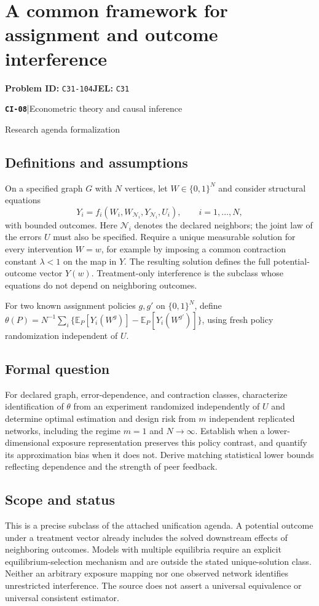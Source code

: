 \documentclass[11pt,a4paper]{article}
\newcommand{\E}{\mathbb E}
\newcommand{\entrymeta}[3]{{\sffamily\small\color{muted}\textbf{\texttt{#1}}\quad|\quad #2\par #3\par}}
\begin{document}
\section*{A common framework for assignment and outcome interference}
\textbf{Problem ID:} \texttt{C31-104}\quad \textbf{JEL:} \texttt{C31}\par
\label{problem:OP-0487}
\label{beyond:CI-08}
\entrymeta{CI-08}{Econometric theory and causal inference}{Research agenda formalization}
\subsection*{Definitions and assumptions}
On a specified graph $G$ with $N$ vertices, let $W\in\{0,1\}^N$ and consider structural equations
\[
Y_i=f_i(W_i,W_{\mathcal N_i},Y_{\mathcal N_i},U_i),
\qquad i=1,\ldots,N,
\]
with bounded outcomes. Here $\mathcal N_i$ denotes the declared neighbors; the joint law of the errors $U$ must also be specified. Require a unique measurable solution for every intervention $W=w$, for example by imposing a common contraction constant $\lambda<1$ on the map in $Y$. The resulting solution defines the full potential-outcome vector $Y(w)$. Treatment-only interference is the subclass whose equations do not depend on neighboring outcomes.

For two known assignment policies $g,g'$ on $\{0,1\}^N$, define $\theta(P)=N^{-1}\sum_i\{\E_P[Y_i(W^g)]-\E_P[Y_i(W^{g'})]\}$, using fresh policy randomization independent of $U$.
\subsection*{Formal question}
For declared graph, error-dependence, and contraction classes, characterize identification of $\theta$ from an experiment randomized independently of $U$ and determine optimal estimation and design risk from $m$ independent replicated networks, including the regime $m=1$ and $N\to\infty$. Establish when a lower-dimensional exposure representation preserves this policy contrast, and quantify its approximation bias when it does not. Derive matching statistical lower bounds reflecting dependence and the strength of peer feedback.
\subsection*{Scope and status}
This is a precise subclass of the attached unification agenda. A potential outcome under a treatment vector already includes the solved downstream effects of neighboring outcomes. Models with multiple equilibria require an explicit equilibrium-selection mechanism and are outside the stated unique-solution class. Neither an arbitrary exposure mapping nor one observed network identifies unrestricted interference. The source does not assert a universal equivalence or universal consistent estimator.
\end{document}
